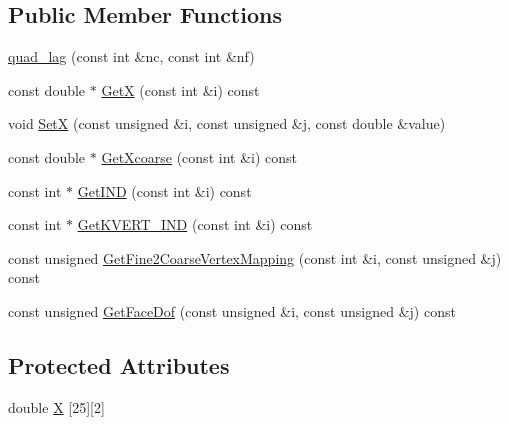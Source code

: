\subsection*{Public Member Functions}
\begin{DoxyCompactItemize}
\item 
\mbox{\hyperlink{classfemus_1_1quad__lag_a6f57a109b73c719401a1f8d83caf33ed}{quad\+\_\+lag}} (const int \&nc, const int \&nf)
\item 
const double $\ast$ \mbox{\hyperlink{classfemus_1_1quad__lag_ad1d8e10798242454170be69efd303523}{GetX}} (const int \&i) const
\item 
void \mbox{\hyperlink{classfemus_1_1quad__lag_a0bd8bb0ef4995d4b70b76e5d92c4c3b2}{SetX}} (const unsigned \&i, const unsigned \&j, const double \&value)
\item 
const double $\ast$ \mbox{\hyperlink{classfemus_1_1quad__lag_a0e07e085178832564a1be9bf1ea95814}{Get\+Xcoarse}} (const int \&i) const
\item 
const int $\ast$ \mbox{\hyperlink{classfemus_1_1quad__lag_a363f9b8e94df40dddec713a4a08350a9}{Get\+I\+ND}} (const int \&i) const
\item 
const int $\ast$ \mbox{\hyperlink{classfemus_1_1quad__lag_ab5c2233d78efd00452fabdaf9eb5c942}{Get\+K\+V\+E\+R\+T\+\_\+\+I\+ND}} (const int \&i) const
\item 
const unsigned \mbox{\hyperlink{classfemus_1_1quad__lag_a331e1c799946c87cfe43ad7c994aef1b}{Get\+Fine2\+Coarse\+Vertex\+Mapping}} (const int \&i, const unsigned \&j) const
\item 
const unsigned \mbox{\hyperlink{classfemus_1_1quad__lag_aad6a7fa04e40018089716a27d78b434e}{Get\+Face\+Dof}} (const unsigned \&i, const unsigned \&j) const
\end{DoxyCompactItemize}
\subsection*{Protected Attributes}
\begin{DoxyCompactItemize}
\item 
double \mbox{\hyperlink{classfemus_1_1quad__lag_af13e53f84160d67b3177fa679ef6810f}{X}} \mbox{[}25\mbox{]}\mbox{[}2\mbox{]}
\end{DoxyCompactItemize}
